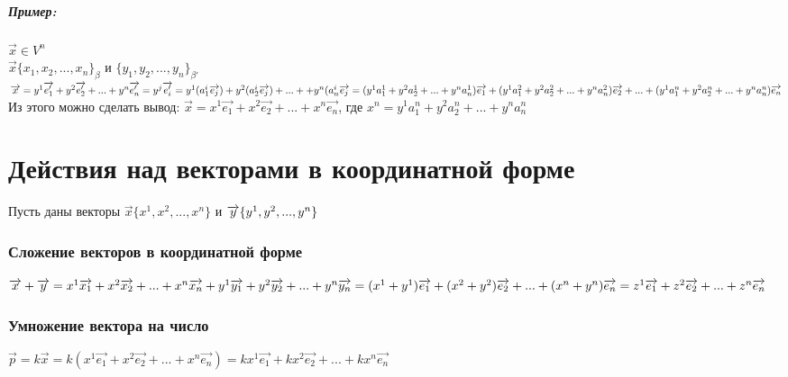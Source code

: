 \documentclass{book}
\begin{document}
\paragraph*{Пример:}
$\overrightarrow{x} \in V^n$\\
$\overrightarrow{x}\{x_1,x_2,...,x_n\}_\beta$ и $\{y_1,y_2,...,y_n\}_{\beta'}$\\
$\overrightarrow{x}=y^1\overrightarrow{e_1'}+y^2\overrightarrow{e_2'}+...+y^n\overrightarrow{e_n'}=y^j\overrightarrow{e_i'}=y^1(a^i_1\overrightarrow{e_j})+y^2(a^i_2\overrightarrow{e_j})+...++y^n(a^i_n\overrightarrow{e_j}=(y^1a_1^1+y^2a_2^1+...+y^{n}a^1_n)\overrightarrow{e_1}+(y^1a_1^2+y^2a_2^2+...+y^{n}a^2_n)\overrightarrow{e_2}+...+(y^1a_1^n+y^2a_2^n+...+y^{n}a^n_n)\overrightarrow{e_n}\\$
Из этого можно сделать вывод:
$\overrightarrow{x}=x^1\overrightarrow{e_1}+x^2\overrightarrow{e_2}+...+x^n\overrightarrow{e_n}$, где $x^n=y^1a_1^n+y^2a_2^n+...+y^{n}a^n_n$

\newpage
\chapter{Действия над векторами в координатной форме}
Пусть даны векторы $\overrightarrow{x}\{x^1,x^2,...,x^n\}$ и $\overrightarrow{y}\{y^1,y^2,...,y^n\}\\$
\subsection{Сложение векторов в координатной форме}
$\overrightarrow{x}+\overrightarrow{y}=x^1\overrightarrow{x_1}+x^2\overrightarrow{x_2}+...+x^n\overrightarrow{x_n}+y^1\overrightarrow{y_1}+y^2\overrightarrow{y_2}+...+y^n\overrightarrow{y_n}=(x^1+y^1)\overrightarrow{e_1}+(x^2+y^2)\overrightarrow{e_2}+...+(x^n+y^n)\overrightarrow{e_n}=z^1\overrightarrow{e_1}+z^2\overrightarrow{e_2}+...+z^n\overrightarrow{e_n}\\$
\subsection{Умножение вектора на число}
$\overrightarrow{p}=k\overrightarrow{x}=k(x^1\overrightarrow{e_1}+x^2\overrightarrow{e_2}+...+x^n\overrightarrow{e_n})=kx^1\overrightarrow{e_1}+kx^2\overrightarrow{e_2}+...+kx^n\overrightarrow{e_n}$
\end{document}
